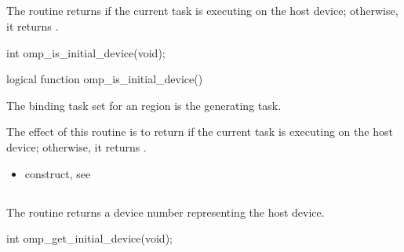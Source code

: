 \subsection{}
\label{subsec:omp_is_initial_device}
\summary
The  routine returns  if the current task is executing 
on the host device; otherwise, it returns .

\begin{samepage}
\format
\begin{ccppspecific}
\begin{boxedcode}
int omp\_is\_initial\_device(void);
\end{boxedcode}
\end{ccppspecific}
\end{samepage}

\begin{fortranspecific}
\begin{boxedcode}
logical function omp\_is\_initial\_device()
\end{boxedcode}
\end{fortranspecific}

\binding
The binding task set for an  region is the generating task.

\effect
The effect of this routine is to return  if the current task is executing on the host 
device; otherwise, it returns .

\crossreferences
\begin{itemize}
\item {} construct, see 
\end{itemize}





\subsection{}
\label{subsec:omp_get_initial_device}
\summary
The  routine returns a device number representing
the host device.

\pagebreak

\begin{samepage}
\format
\begin{ccppspecific}
\begin{boxedcode}
int omp\_get\_initial\_device(void);
\end{boxedcode}
\end{ccppspecific}
\end{samepage}

